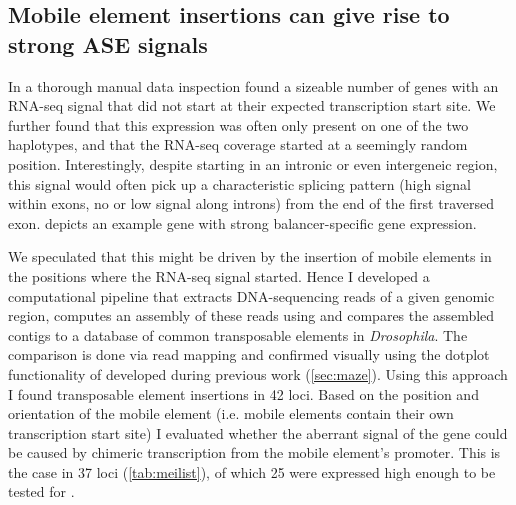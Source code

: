 \subsection{Mobile element insertions can give rise to strong ASE signals}
\label{sec:balancer_ase_mei}


In a thorough manual data inspection \yad found a sizeable number of genes with
an RNA-seq signal that did not start at their expected transcription start site.
We further found that this expression was often only present on one of the two
haplotypes, and that the RNA-seq coverage started at a seemingly random
position. Interestingly, despite starting in an intronic or even intergeneic
region, this signal would often pick up a characteristic splicing pattern
(high signal within exons, no or low signal along introns) from the end of the
first traversed exon.  depicts an example gene
with strong balancer-specific gene expression.

We speculated that this might be driven by the insertion of mobile elements in
the positions where the RNA-seq signal started. Hence I developed a computational
pipeline that extracts DNA-sequencing reads of a given genomic region,
computes an assembly of these reads using \spades and compares the assembled
contigs to a database of common transposable elements in \textit{Drosophila}.
The comparison is done via read mapping and confirmed visually using the dotplot
functionality of \maze developed during previous work (\cref{sec:maze}). Using this
approach I found transposable element insertions in 42 loci. Based on the
position and orientation of the mobile element (i.e. mobile elements contain
their own transcription start site) I evaluated whether the aberrant \ase
signal of the gene could be caused by chimeric transcription from the mobile
element’s promoter. This is the case in 37 loci (\cref{tab:meilist}),
of which 25 were expressed high enough to be tested for \ase.

